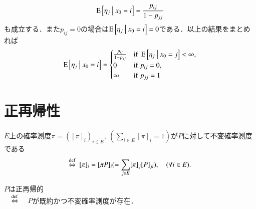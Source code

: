 \begin{prf}
\begin{align}
			\operatorname{E} \left[ \eta_j \ \middle|\ x_0 = i \right] = \frac{p_{ij}}{1 - p_{jj}}
		\end{align}
		も成立する．また$p_{ij} = 0$の場合は$\operatorname{E} \left[ \eta_j \ \middle|\ x_0 = i \right] = 0$である．以上の結果をまとめれば
		\begin{align}
			\cexp{\eta_j}{x_0 = i} = \begin{cases}
				\frac{p_{ij}}{1 - p_{jj}} & {\rm if}\ \cexp{\eta_j}{x_0 = j} < \infty, \\
				0 & {\rm if}\ p_{ij} = 0, \\
				\infty & {\rm if}\ p_{jj} = 1
			\end{cases}
		\end{align}
		\QED
	\end{prf}

\section{正再帰性}
	\begin{dfn}[不変確率測度]
		$E$上の確率測度$\pi = ([\pi]_i)_{i \in E},\ (\sum_{i \in E} [\pi]_i = 1)$が$P$に対して不変確率測度である
		\begin{align}
			\overset{\mathrm{def}}{\Leftrightarrow}\ [\pi]_i = [\pi P]_i ( = \sum_{j \in E}[\pi]_j [P]_{ji} ), \quad (\forall i \in E).
		\end{align}
	\end{dfn}
	\begin{dfn}[正再帰性]
		$P$は正再帰的 \\
		$\quad\overset{\mathrm{def}}{\Leftrightarrow}\quad$ $P$が既約かつ不変確率測度が存在． 
	\end{dfn}
